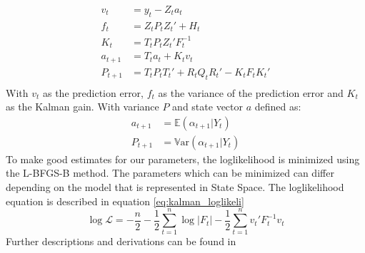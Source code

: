\begin{equation}
\label{eq:kalman_equations}
\begin{split}
    v_t &= y_t - Z_t a_t\\
    f_t &= Z_t P_t Z_t' + H_t\\
    K_t &= T_t P_t Z_t' F_t^{-1}\\
    a_{t+1} &= T_t a_t + K_t v_t\\
    P_{t+1} &= T_t P_t T_t' + R_t Q_t R_t' - K_t F_t K_t'\\
\end{split}
\end{equation}
With $v_t$ as the prediction error, $f_t$ as the variance of the prediction error and $K_t$ as the Kalman gain. With variance $P$ and state vector $a$ defined as:
\begin{equation*}
\begin{split}    
    a_{t+1} &= \mathbb{E}(\alpha_{t+1}|Y_t)\\
    P_{t+1} &= \mathbb{V}\text{ar}(\alpha_{t+1}|Y_t)
\end{split}
\end{equation*}
To make good estimates for our parameters, the loglikelihood is minimized using the L-BFGS-B method. The parameters which can be minimized can differ depending on the model that is represented in State Space. The loglikelihood equation is described in equation \ref{eq:kalman_loglikeli}
\begin{equation}
    \log \mathcal{L} = -\frac{n}{2} - \frac{1}{2}\sum\limits_{t=1}^n \log|F_t| - \frac{1}{2}\sum\limits_{t=1}^n v_t' F_t^{-1} v_t
\label{eq:kalman_loglikeli}
\end{equation}
Further descriptions and derivations can be found in \cite{Durbin2012TimeModels}\\
